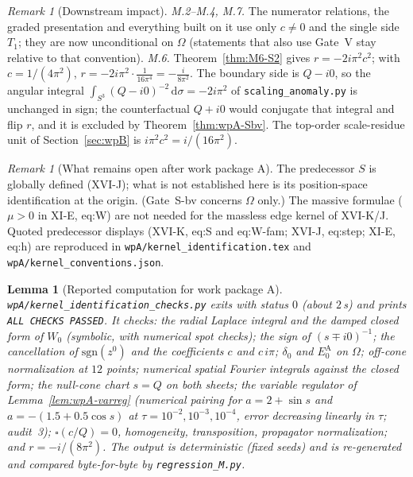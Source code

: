 \documentclass{article}
\newtheorem{lemma}[proposition]{Lemma}
\theoremstyle{remark}
\newtheorem{remark}[proposition]{Remark}
\begin{document}
\begin{remark}[Downstream impact]
\label{rem:wpA-M6}
\emph{M.2--M.4, M.7.} The numerator relations, the graded presentation and everything built on it use only $c\neq0$ and the single side $T_1$; they are now unconditional on $\Omega$ (statements that also use Gate~V stay relative to that convention).
\emph{M.6.} Theorem~\ref{thm:M6-S2} gives $r=-2i\pi^2c^2$; with $c=1/(4\pi^2)$,
$r=-2i\pi^2\cdot\frac1{16\pi^4}=-\frac{i}{8\pi^2}$.
The boundary side is $Q-i0$, so the angular integral $\int_{S^3}(Q-i0)^{-2}\,\mathrm d\sigma=-2i\pi^2$ of \texttt{scaling\_anomaly.py} is unchanged in sign; the counterfactual $Q+i0$ would conjugate that integral and flip $r$, and it is excluded by Theorem~\ref{thm:wpA-Sbv}.
The top-order scale-residue unit of Section~\ref{sec:wpB} is $i\pi^2c^2=i/(16\pi^2)$.
\end{remark}

\begin{remark}[What remains open after work package A]
\label{rem:wpA-open}
The predecessor $S$ is globally defined (XVI-J); what is not established here is its position-space identification at the origin. (Gate~S-bv concerns $\Omega$ only.)
The massive formulae ($\mu>0$ in XI-E, eq:W) are not needed for the massless edge kernel of XVI-K/J.
Quoted predecessor displays (XVI-K, eq:S and eq:W-fam; XVI-J, eq:step; XI-E, eq:h) are reproduced in \texttt{wpA/kernel\_identification.tex} and \texttt{wpA/kernel\_conventions.json}.
\end{remark}

\begin{lemma}[Reported computation for work package A]
\label{lem:wpA-comp}
\texttt{wpA/kernel\_identification\_checks.py} exits with status $0$ (about $2$\,s) and prints \texttt{ALL CHECKS PASSED}.
It checks: the radial Laplace integral and the damped closed form of $W_0$ (symbolic, with numerical spot checks); the sign of $(s\mp i0)^{-1}$; the cancellation of $\mathrm{sgn}(z^0)$ and the coefficients $c$ and $c\,i\pi$; $\delta_0$ and $E_0^{\mathrm A}$ on $\Omega$; off-cone normalization at $12$ points; numerical spatial Fourier integrals against the closed form; the null-cone chart $s=Q$ on both sheets; the variable regulator of Lemma~\ref{lem:wpA-varreg} (numerical pairing for $a=2+\sin s$ and $a=-(1.5+0.5\cos s)$ at $\tau=10^{-2},10^{-3},10^{-4}$, error decreasing linearly in $\tau$; audit~3); $\square(c/Q)=0$, homogeneity, transposition, propagator normalization; and $r=-i/(8\pi^2)$.
The output is deterministic (fixed seeds) and is re-generated and compared byte-for-byte by \texttt{regression\_M.py}.
\end{lemma}
\end{document}
